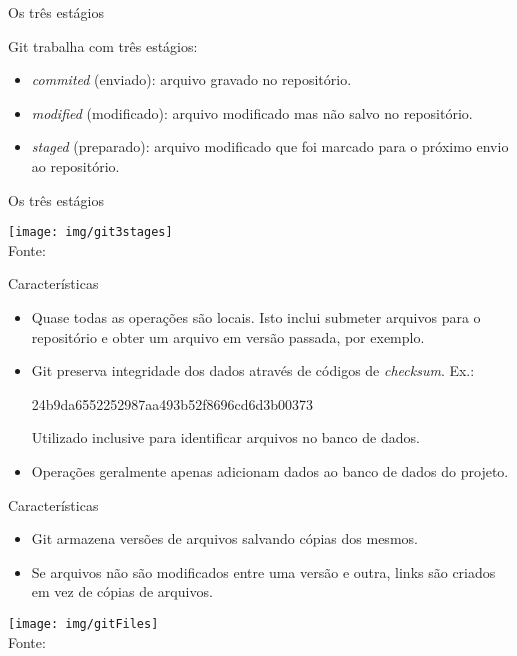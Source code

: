 \documentclass[a4paper]{beamer}
\begin{document}
\begin{frame}{Os três estágios}

Git trabalha com três estágios:
\begin{itemize}
\item \textit{commited} (enviado): arquivo gravado no repositório.
\item \textit{modified} (modificado): arquivo modificado mas não salvo no repositório.
\item \textit{staged} (preparado): arquivo modificado que foi marcado para o próximo envio ao repositório.
\end{itemize}

\end{frame}

\begin{frame}{Os três estágios}
\begin{center}
\texttt{[image: img/git3stages]}\\
{\scriptsize Fonte: \cite{proGit}}
\end{center}
\end{frame}

\begin{frame}{Características}

\begin{itemize}[<+->]
\item Quase todas as operações são locais. Isto inclui submeter arquivos para o repositório e obter um arquivo em versão passada, por exemplo.
\item Git preserva integridade dos dados através de códigos de \textit{checksum}. Ex.:
\begin{center}
24b9da6552252987aa493b52f8696cd6d3b00373
\end{center}
Utilizado inclusive para identificar arquivos no banco de dados.
\item Operações geralmente apenas adicionam dados ao banco de dados do projeto.
\end{itemize}

\end{frame}

\begin{frame}{Características}

\begin{itemize}
\item Git armazena versões de arquivos salvando cópias dos mesmos.
\item Se arquivos não são modificados entre uma versão e outra, links são criados em vez de cópias de arquivos.
\end{itemize}

\begin{center}
\texttt{[image: img/gitFiles]}\\
{\scriptsize Fonte: \cite{proGit}}
\end{center}

\end{frame}
\end{document}

